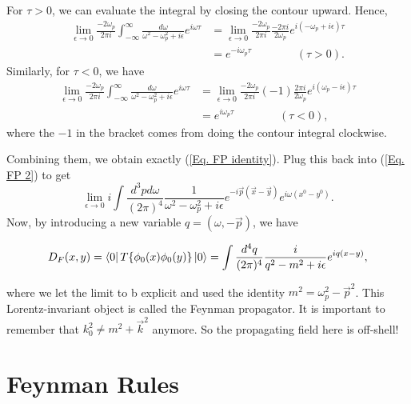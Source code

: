 \documentclass[11pt]{article}
\theoremstyle{definition}
\begin{document}
For $\tau > 0$, we can evaluate the integral by closing the contour upward. Hence,
\begin{equation}
\begin{aligned}
        \lim_{\epsilon \rightarrow 0} \frac{-2\omega_p}{2\pi i} \int^\infty_{-\infty} \frac{d\omega}{\omega^2 - \omega_p^2 +i\epsilon} e^{i\omega \tau} &= \lim_{\epsilon \rightarrow 0} \frac{-2\omega_p}{2\pi i} \frac{-2\pi i}{2\omega_p} e^{i(-\omega_p+i\epsilon)\tau}\\
        &= e^{-i\omega_p\tau} \qquad \qquad {(\tau >0)}.
\end{aligned}
\end{equation}
Similarly, for $\tau < 0$, we have
\begin{equation}
\begin{aligned}
        \lim_{\epsilon \rightarrow 0} \frac{-2\omega_p}{2\pi i} \int^\infty_{-\infty} \frac{d\omega}{\omega^2 - \omega_p^2 +i\epsilon} e^{i\omega \tau} &= \lim_{\epsilon \rightarrow 0} \frac{-2\omega_p}{2\pi i} (-1) \frac{2\pi i}{2\omega_p} e^{i(\omega_p-i\epsilon)\tau}\\
        &= e^{i\omega_p\tau} \qquad \qquad {(\tau < 0)},
\end{aligned}
\end{equation}
where the $-1$ in the bracket comes from doing the contour integral clockwise.

Combining them, we obtain exactly (\ref{Eq. FP identity}). Plug this back into (\ref{Eq. FP 2}) to get
\begin{equation}
    \lim_{\epsilon\rightarrow0} i\int \frac{d^3p d\omega}{(2\pi)^4} \frac{1}{\omega^2 - \omega_p^2 +i\epsilon} e^{-i\vec{p}(\vec{x}-\vec{y})} e^{i\omega(x^0-y^0)}.
\end{equation}
Now, by introducing a new variable $q=(\omega, -\vec{p})$, we have
\begin{shaded}
    \begin{equation}
        D_F(x, y) = \bra{0}T\{\phi_0(x)\phi_0(y)\}\ket{0} = \int \frac{d^4q }{(2\pi)^4} \frac{i}{q^2 - m^2 +i\epsilon} e^{iq(x-y)},
    \end{equation}
\end{shaded}
where we let the limit to b explicit and used the identity $m^2 = \omega_p^2 - \vec{p}^2$. This Lorentz-invariant object is called the Feynman propagator. It is important to remember that $k_0^2 \neq m^2 + \vec{k}^2$ anymore. So the propagating field here is off-shell!

\section{Feynman Rules}
\end{document}
